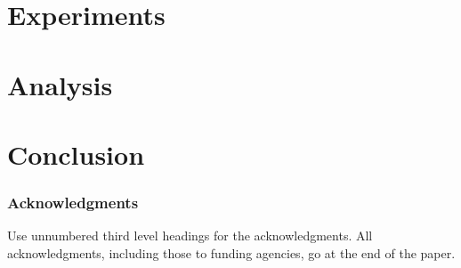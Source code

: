 \documentclass[]{article} %
\begin{document}
\section{Experiments}


\section{Analysis}


\section{Conclusion}



\subsubsection*{Acknowledgments}

Use unnumbered third level headings for the acknowledgments. All
acknowledgments, including those to funding agencies, go at the end of the paper.


\end{document}
